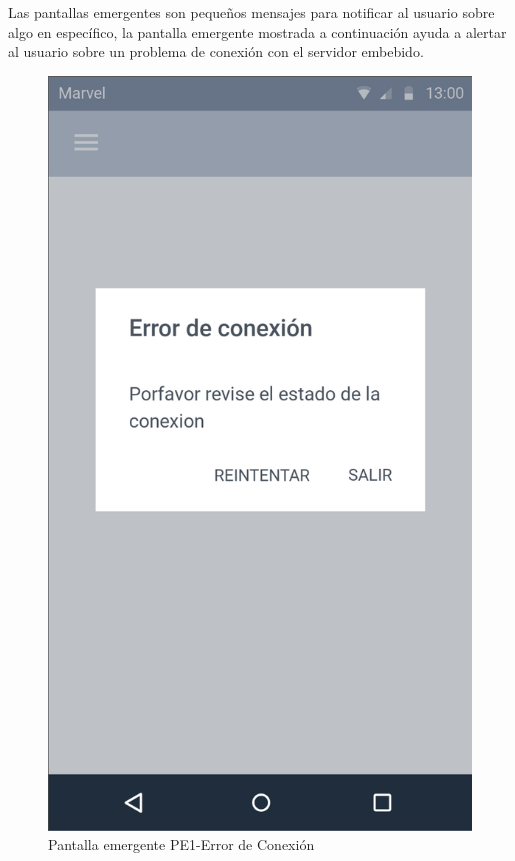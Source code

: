 Las pantallas emergentes son pequeños mensajes para notificar al usuario sobre algo en específico, la pantalla emergente mostrada a continuación ayuda a alertar al usuario sobre un problema de conexión con el servidor embebido.

\begin{figure}[H]
	\centering
	\includegraphics[scale=0.70]{Capitulo4/software/submodulos/images/error_con.png}
	\caption{Pantalla emergente PE1-Error de Conexión}
	\label{fig:Error de Conexion}
\end{figure}

